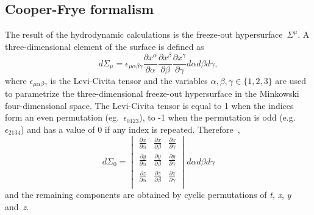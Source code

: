     \subsection{Cooper-Frye formalism}
      The result of the hydrodynamic calculations is the freeze-out hypersurface~$\Sigma^\mu$.
      A three-dimensional element of the surface is defined as~\cite{therminator2} 
      \begin{equation}
      d\Sigma_\mu = \epsilon_{\mu\alpha\beta\gamma} \frac{\partial x^\alpha}{\partial \alpha} \frac{\partial x^\beta}{\partial \beta} \frac{\partial x^\gamma}{\partial \gamma} d\alpha d\beta d\gamma ,
      \end{equation}
      where $\epsilon_{\mu\alpha\beta\gamma}$ is the Levi-Civita tensor and the variables $\alpha, \beta, \gamma \in \{1,2,3\}$ are used to parametrize the three-dimensional freeze-out hypersurface in the Minkowski four-dimensional space.
      The Levi-Civita tensor is equal to 1 when the indices form an even permutation (eg.~$\epsilon_{0123}$), to -1 when the permutation is odd (e.g. $\epsilon_{2134}$) and has a value of 0 if any index is repeated. Therefore~\cite{therminator2},
      \begin{equation}
        d \Sigma_0  = 
        \begin{vmatrix}
          \frac{\partial x}{\partial \alpha} & \frac{\partial x}{\partial \beta} & \frac{\partial x}{\partial \gamma} \\
          \frac{\partial y}{\partial \alpha} & \frac{\partial y}{\partial \beta} & \frac{\partial y}{\partial \gamma} \\
          \frac{\partial z}{\partial \alpha} & \frac{\partial z}{\partial \beta} & \frac{\partial z}{\partial \gamma} \\
        \end{vmatrix} d \alpha d \beta d \gamma
      \end{equation}
      and the remaining components are obtained by cyclic permutations of \textit{t}, \textit{x}, \textit{y} and~\textit{z}.

